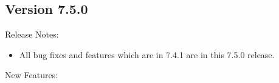 \subsection*{\label{sec:New-7-5-0}Version 7.5.0}

\noindent Release Notes:

\begin{itemize}

\item All bug fixes and features which are in 7.4.1 are in this 7.5.0 release.

\end{itemize}


\noindent New Features:

